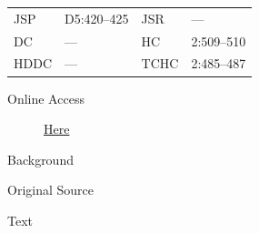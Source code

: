 					\begin{tabular}{p{0.5in}p{1in}p{0.5in}p{1in}}
					JSP	 	& D5:420--425		& JSR 		& --- \\
					DC	 	& ---				& HC 		& 2:509--510 \\
					HDDC 	& ---				& TCHC 		& 2:485--487 \\
					\end{tabular}
				
				\begin{description}
					\item[Online Access] \href{https://www.josephsmithpapers.org/paper-summary/minutes-3-september-1837/1}{Here}
				\end{description}
				
				\begin{description}
					\item[Background]
				\end{description}
				
				
				\begin{description}
					\item[Original Source]
				\end{description}
				
				
				\begin{description}
					\item[Text]
				\end{description}
				
